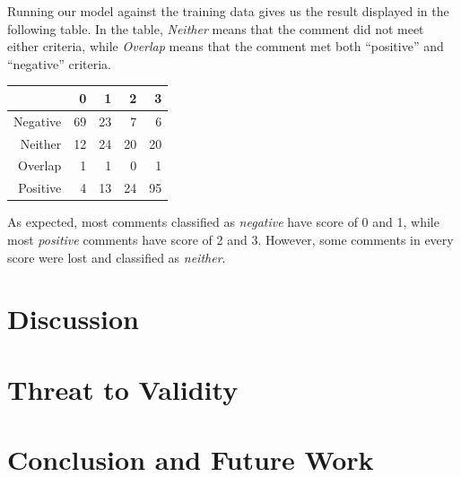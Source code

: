 \documentclass[conference]{IEEEtran}
\begin{document}

Running our model against the training data gives us the result displayed in the following table.
In the table, \emph{Neither} means that the comment did not meet either criteria, while \emph{Overlap} means that the comment  met both ``positive'' and ``negative'' criteria.

\begin{center}
\begin{tabular}{|r|rrrr|}
\hline
& \bfseries 0 & \bfseries 1 & \bfseries 2 & \bfseries 3 \\
\hline
Negative & 69 & 23 & 7 & 6 \\
Neither & 12 & 24 & 20 & 20 \\
Overlap & 1 & 1 & 0 & 1 \\
Positive & 4 & 13 & 24 & 95 \\
\hline
\end{tabular}
\end{center}

As expected, most comments classified as \emph{negative} have score of 0 and 1,
while most \emph{positive} comments have score of 2 and 3.
However, some comments in every score were lost and classified as \emph{neither}.




\section{Discussion}







\section{Threat to Validity}


\section{Conclusion and Future Work}


\IEEEpeerreviewmaketitle



%



\end{document}
